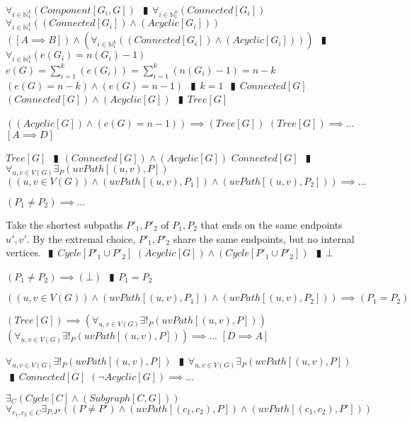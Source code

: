 \documentclass{book}
\newcommand{\pipe}{$\phantom{(}\vrectangleblack\phantom{)}$}
\begin{document}
\begin{enumerate}
\begin{enumerate}
    \lit $\forall_{i \in \mathbb{N}_1^k}(Component[G_i, G])$ \pipe $\forall_{i \in \mathbb{N}_1^k}(Connected[G_i])$
    \lit $\forall_{i \in \mathbb{N}_1^k}((Connected[G_i]) \land (Acyclic[G_i]))$
    \lit $([A \implies B]) \land (\forall_{i \in \mathbb{N}_1^k}((Connected[G_i]) \land (Acyclic[G_i])))$ \pipe $\forall_{i \in \mathbb{N}_1^k}(e(G_i) = n(G_i) - 1)$
    \lit $e(G) = \sum \limits_{i = 1}^k(e(G_i)) = \sum \limits_{i = 1}^k(n(G_i) - 1) = n - k$
    \lit $(e(G) = n - k) \land (e(G) = n - 1)$ \pipe $k = 1$ \pipe $Connected[G]$
    \lit $(Connected[G]) \land (Acyclic[G])$ \pipe $Tree[G]$
  \end{enumerate}
  \lit $((Acyclic[G]) \land (e(G) = n - 1)) \implies (Tree[G])$
  \lit $(Tree[G]) \implies \ldots$    $[A \implies D]$
  \begin{enumerate}
    \lit $Tree[G]$ \pipe $(Connected[G]) \land (Acyclic[G])$
    \lit $Connected[G]$ \pipe $\forall_{u, v \in V(G)} \exists_{P}(uvPath[(u, v), P])$
    \lit $((u, v \in V(G)) \land (uvPath[(u, v), P_1]) \land (uvPath[(u, v), P_2])) \implies \ldots$
    \begin{enumerate}
      \lit $(P_1 \neq P_2) \implies \ldots$
      \begin{enumerate}
        \lit Take the shortest subpaths $P'_1, P'_2$ of $P_1, P_2$ that ends on the same endpoints $u', v'$.
        \lit By the extremal choice, $P'_1, P'_2$ share the same endpoints, but no internal vertices. \pipe $Cycle[P'_1 \cup P'_2]$
        \lit $(Acyclic[G]) \land (Cycle[P'_1 \cup P'_2])$ \pipe $\bot$
      \end{enumerate}
      \lit $(P_1 \neq P_2) \implies (\bot)$ \pipe $P_1 = P_2$
    \end{enumerate}
    \lit $((u, v \in V(G)) \land (uvPath[(u, v), P_1]) \land (uvPath[(u, v), P_2])) \implies (P_1 = P_2)$
  \end{enumerate}
  \lit $(Tree[G]) \implies (\forall_{u, v \in V(G)} \exists!_{P}(uvPath[(u, v), P]))$
  \lit $(\forall_{u, v \in V(G)} \exists!_{P}(uvPath[(u, v), P])) \implies \ldots$    $[D \implies A]$
  \begin{enumerate}
    \lit $\forall_{u, v \in V(G)} \exists!_{P}(uvPath[(u, v), P])$ \pipe $\forall_{u, v \in V(G)} \exists_{P}(uvPath[(u, v), P])$ \pipe $Connected[G]$
    \lit $(\lnot Acyclic[G]) \implies \ldots$
    \begin{enumerate}
      \lit $\exists_{C}(Cycle[C] \land (Subgraph[C, G]))$
      \lit $\forall_{c_1, c_2 \in C} \exists_{P, P'}((P \neq P') \land (uvPath[(c_1, c_2), P]) \land (uvPath[(c_1, c_2), P']))$

\end{enumerate}
\end{enumerate}
\end{enumerate}
\end{document}
